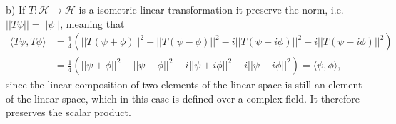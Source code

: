 \documentclass{article}
\begin{document}
b) If $T: \mathcal H \to \mathcal H$ is a isometric linear transformation it preserve the norm, i.e. $||T \psi|| = ||\psi||$, meaning that
\[
     \begin{split}
         \langle T\psi, T\phi \rangle &= \frac{1}{4} ( ||T(\psi + \phi)||^2 - ||T(\psi - \phi)||^2 - i||T(\psi + i\phi)||^2 + i||T(\psi - i\phi)||^2)\\
         &= \frac{1}{4} ( ||\psi + \phi||^2 - ||\psi - \phi||^2 - i||\psi + i\phi||^2 + i||\psi - i\phi||^2) = \langle \psi, \phi \rangle,
     \end{split}
\]
since the linear composition of two elements of the linear space is still an element of the linear space, which in this case is defined over a complex field. It therefore preserves the scalar product.
\end{document}
